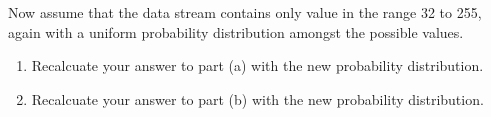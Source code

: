 \documentclass[10pt, a4paper]{article}
\begin{document}
\begin{enumerate}
\begin{enumerate}
    \end{enumerate}
    Now assume that the data stream contains only value in the range 32 to 255, again with a uniform probability distribution amongst the possible values.
    \begin{enumerate}
    \item Recalcuate your answer to part (a) with the new probability distribution.\\
    \item Recalcuate your answer to part (b) with the new probability distribution.\\
    \end{enumerate}

\end{enumerate}
\end{document}
